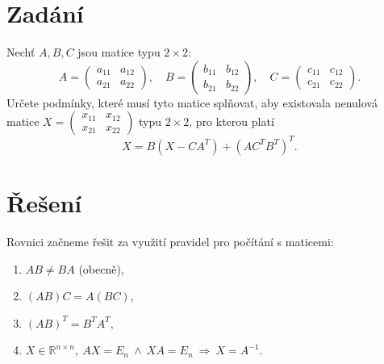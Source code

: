 \documentclass[12pt,a4paper]{article}
\begin{document}
\section*{Zadání}

Nechť $A, B, C$ jsou matice typu $2\times 2$:
\[
A=\begin{pmatrix} a_{11} & a_{12}\\ a_{21} & a_{22}\end{pmatrix},\quad
B=\begin{pmatrix} b_{11} & b_{12}\\ b_{21} & b_{22}\end{pmatrix},\quad
C=\begin{pmatrix} c_{11} & c_{12}\\ c_{21} & c_{22}\end{pmatrix}.
\]
Určete podmínky, které musí tyto matice splňovat, aby existovala nenulová matice
$X=\begin{pmatrix} x_{11} & x_{12}\\ x_{21} & x_{22}\end{pmatrix}$ typu $2\times 2$, pro kterou platí
\[
X = B\left(X - CA^{T}\right) + \left(AC^{T}B^{T}\right)^{T}.
\]

\section*{Řešení}

Rovnici začneme řešit za využití pravidel pro počítání s maticemi:
\begin{enumerate}
  \item $AB \neq BA$ (obecně),
  \item $(AB)C = A(BC)$,
  \item $(AB)^{T} = B^{T}A^{T}$,
  \item $X\in\mathbb{R}^{n\times n},\ AX=E_n \ \wedge\ XA=E_n \ \Rightarrow\ X=A^{-1}$.
\end{enumerate}
\end{document}
